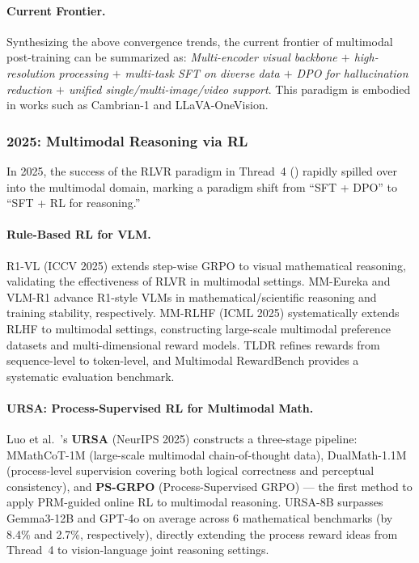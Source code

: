 \paragraph{Current Frontier.}
Synthesizing the above convergence trends, the current frontier of multimodal post-training can be summarized as:
\textit{Multi-encoder visual backbone $+$ high-resolution processing $+$
multi-task SFT on diverse data $+$ DPO for hallucination reduction $+$
unified single/multi-image/video support}.
This paradigm is embodied in works such as Cambrian-1 and LLaVA-OneVision.

\subsubsection{2025: Multimodal Reasoning via RL}
\label{sec:t5-reasoning-rl}

In 2025, the success of the RLVR paradigm in Thread~4 ()
rapidly spilled over into the multimodal domain,
marking a paradigm shift from ``SFT + DPO'' to ``SFT + RL for reasoning.''

\paragraph{Rule-Based RL for VLM.}
R1-VL \cite{zhang2025r1vl} (ICCV 2025) extends step-wise GRPO to visual mathematical reasoning,
validating the effectiveness of RLVR in multimodal settings.
MM-Eureka \cite{meng2025mmeureka} and VLM-R1 \cite{shen2025vlmr1}
advance R1-style VLMs in mathematical/scientific reasoning and training stability, respectively.
MM-RLHF \cite{zhang2025mmrlhf} (ICML 2025) systematically extends RLHF to multimodal settings,
constructing large-scale multimodal preference datasets and multi-dimensional reward models.
TLDR \cite{fu2025tldr} refines rewards from sequence-level to token-level,
and Multimodal RewardBench \cite{yasunaga2025mmrewardbench} provides a systematic evaluation benchmark.

\paragraph{URSA: Process-Supervised RL for Multimodal Math.}
Luo et al.\ \cite{luo2025ursa}'s \textbf{URSA} (NeurIPS 2025) constructs a three-stage pipeline:
MMathCoT-1M (large-scale multimodal chain-of-thought data),
DualMath-1.1M (process-level supervision covering both logical correctness and perceptual consistency),
and \textbf{PS-GRPO} (Process-Supervised GRPO) ---
the first method to apply PRM-guided online RL to multimodal reasoning.
URSA-8B surpasses Gemma3-12B and GPT-4o on average across 6 mathematical benchmarks
(by 8.4\% and 2.7\%, respectively),
directly extending the process reward ideas from Thread~4
to vision-language joint reasoning settings.

